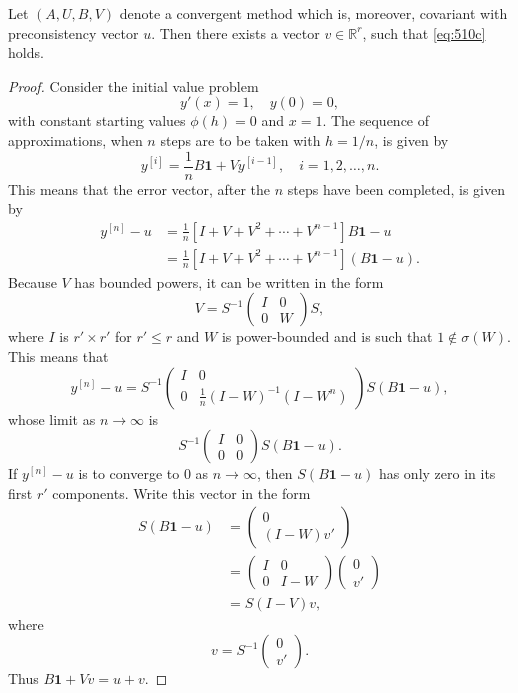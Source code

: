 \begin{theorem}

  \label{thm:514A}
Let $(A, U, B, V)$ denote a convergent method which is, moreover, covariant with preconsistency vector $u$. Then there exists a vector $v \in \mathbb{R}^r$, such that \eqref{eq:510c} holds.
\end{theorem}

\begin{proof}
Consider the initial value problem
\[
y'(x) = 1, \quad y(0) = 0,
\]
with constant starting values $\phi(h) = 0$ and $x = 1$. The sequence of approximations, when $n$ steps are to be taken with $h = 1/n$, is given by
\[
y^{[i]} = \frac{1}{n} B\mathbf{1} + V y^{[i-1]}, \quad i = 1, 2, \dots, n.
\]
This means that the error vector, after the $n$ steps have been completed, is given by
\begin{align*}
y^{[n]} - u &= \frac{1}{n} \left[ I + V + V^2 + \cdots + V^{n-1} \right] B\mathbf{1} - u \\
&= \frac{1}{n} \left[ I + V + V^2 + \cdots + V^{n-1} \right] (B\mathbf{1} - u).
\end{align*}
Because $V$ has bounded powers, it can be written in the form
\[
V = S^{-1} \begin{pmatrix} I & 0 \\ 0 & W \end{pmatrix} S,
\]
where $I$ is $r' \times r'$ for $r' \leq r$ and $W$ is power-bounded and is such that $1 \notin \sigma(W)$. This means that
\[
y^{[n]} - u = S^{-1} \begin{pmatrix} I & 0 \\ 0 & \frac{1}{n}(I - W)^{-1}(I - W^n) \end{pmatrix} S(B\mathbf{1} - u),
\]
whose limit as $n \to \infty$ is
\[
S^{-1} \begin{pmatrix} I & 0 \\ 0 & 0 \end{pmatrix} S(B\mathbf{1} - u).
\]
If $y^{[n]} - u$ is to converge to $0$ as $n \to \infty$, then $S(B\mathbf{1} - u)$ has only zero in its first $r'$ components. Write this vector in the form
\begin{align*}
S(B\mathbf{1} - u) &= \begin{pmatrix} 0 \\ (I - W) v' \end{pmatrix} \\
&= \begin{pmatrix} I & 0 \\ 0 & I - W \end{pmatrix} \begin{pmatrix} 0 \\ v' \end{pmatrix} \\
&= S(I - V)v,
\end{align*}
where
\[
v = S^{-1} \begin{pmatrix} 0 \\ v' \end{pmatrix}.
\]
Thus $B\mathbf{1} + Vv = u + v$.
\end{proof}


